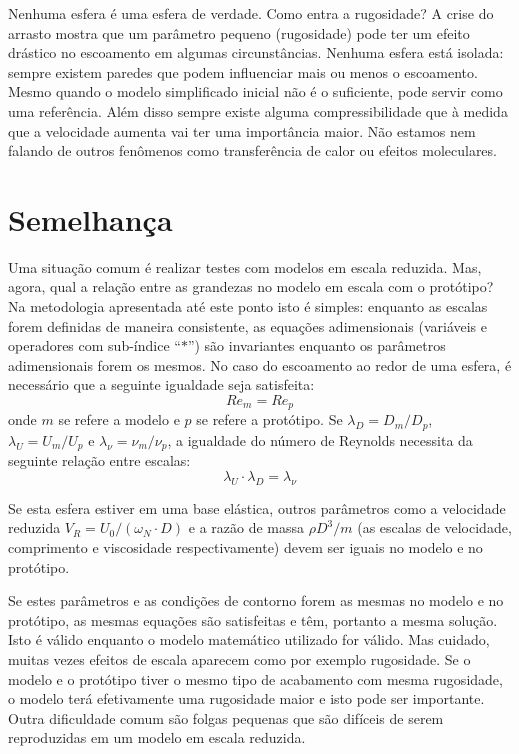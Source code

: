 \documentclass[article,12pt,oneside,a4paper,english,brazil,sumario=tradicional]{abntex2}
\begin{document}
Nenhuma esfera é uma esfera de verdade. Como entra a rugosidade? A crise do arrasto mostra que um parâmetro pequeno (rugosidade) pode ter um efeito drástico no escoamento em algumas circunstâncias. Nenhuma esfera está isolada: sempre existem paredes que podem influenciar mais ou menos o escoamento. Mesmo quando o modelo simplificado inicial não é o suficiente, pode servir como uma referência. Além disso sempre existe alguma compressibilidade que à medida que a velocidade aumenta vai ter uma importância maior. Não estamos nem falando de outros fenômenos como transferência de calor ou efeitos moleculares.



\section{Semelhança}

Uma situação comum é realizar testes com modelos em escala reduzida. Mas, agora, qual a relação entre as grandezas no modelo em escala com o protótipo? Na metodologia apresentada até este ponto isto é simples: enquanto as escalas forem definidas de maneira consistente, as equações adimensionais (variáveis e operadores com sub-índice ``$*$'') são invariantes enquanto os parâmetros adimensionais forem os mesmos. No caso do escoamento ao redor de uma esfera, é necessário que a seguinte igualdade seja satisfeita:
\[
Re_m = Re_p
\]
onde $m$ se refere a modelo e $p$ se refere a protótipo. Se $\lambda_D = D_m/D_p$, $\lambda_U = U_m/U_p$ e $\lambda_\nu = \nu_m/\nu_p$, a igualdade do número de Reynolds necessita da seguinte relação entre escalas:
\[
\lambda_U\cdot\lambda_D = \lambda_\nu
\]



Se esta esfera estiver em uma base elástica, outros parâmetros como a velocidade reduzida $V_R = U_0/(\omega_N\cdot D)$  e a razão de massa $\rho D^3/m$ (as escalas de velocidade, comprimento e viscosidade respectivamente) devem ser iguais no modelo e no protótipo. 

Se estes parâmetros e as condições de contorno forem as mesmas no modelo e no protótipo, as mesmas equações são satisfeitas e têm, portanto a mesma solução. Isto é válido enquanto o modelo matemático utilizado for válido. Mas cuidado, muitas vezes efeitos de escala aparecem como por exemplo rugosidade. Se o modelo e o protótipo tiver o mesmo tipo de acabamento com mesma rugosidade, o modelo terá efetivamente uma rugosidade maior e isto pode ser importante. Outra dificuldade comum são folgas pequenas que são difíceis de serem reproduzidas em um modelo em escala reduzida.
\end{document}

